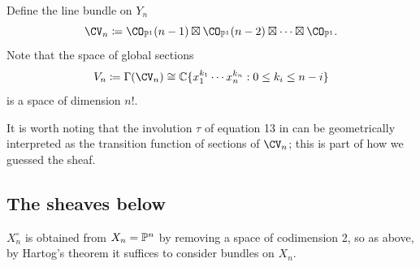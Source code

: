 \documentclass[11pt,reqno]{amsart}
\begin{document}
Define the line bundle on $Y_n$
\[\CV_n\coloneqq \CO_{\BP^1}(n-1)\boxtimes\CO_{\BP^1}(n-2)\boxtimes\cdots\boxtimes\CO_{\BP^1}.\]
Note that the space of global sections
\[V_n\coloneqq \Gamma(\CV_n)\cong\BC\{ x_1^{k_1}\cdots x_n^{k_n}: 0\le k_i\le n-i\}\] 
is a space of dimension $n!$. 

\begin{remark}
    It is worth noting that the involution $\tau$ of equation 13 in \cite{KMZ} can be geometrically interpreted as the transition function of sections of $\CV_n$; this is part of how we guessed the sheaf. 
\end{remark}

\subsection{The sheaves below}
$ X_n^\circ$ is obtained from $X_n=\mathbb P^n$ by removing a space of codimension 2, so as above, by Hartog's theorem it suffices to consider bundles on $X_n$. 
\end{document}
